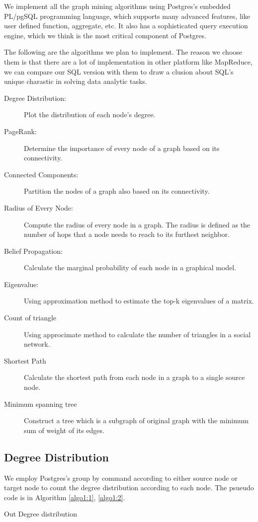 We implement all the graph mining algorithms using Postgres's embedded PL/pgSQL programming language, which supports many advanced features, like user defined function, aggregate, etc. It also has a sophisticated query execution engine, which we think is the most critical component of Postgres.

The following are the algorithms we plan to implement. The reason we choose them is that there are a lot of implementation in other platform like MapReduce, we can compare our SQL version with them to draw a clusion about SQL's unique charastic in solving data analytic tasks.

\begin{description}
  \item[Degree Distribution:] Plot the distribution of each node's degree. 
  \item[PageRank:] Determine the importance of every node of a graph based on its connectivity. 
  \item[Connected Components:] Partition the nodes of a graph also based on its connectivity.
  \item[Radius of Every Node:] Compute the radius of every node in a graph. The radius is defined as the number of hops that a node needs to reach to its furthest neighbor.
  \item[Belief Propagation:] Calculate the marginal probability of each node in a graphical model. 
  \item[Eigenvalue:] Using approximation method to estimate the top-k eigenvalues of a matrix.
  \item[Count of triangle] Using approcimate method to calculate the number of triangles in a social network.
  \item[Shortest Path] Calculate the shortest path from each node in a graph to a single source node. 
  \item[Minimum spanning tree] Construct a tree which is a subgraph of original graph with the minimum sum of weight of its edges. 
\end{description}

\subsection{Degree Distribution}
We employ Postgres's group by command according to either source node or target node to count the degree distribution according to each node. The psueudo code is in Algorithm \ref{algo1:1}, \ref{algo1:2}.

\begin{algorithm}
\caption{Out Degree distribution}
\begin{algorithmic}
\end{algorithmic}
\label{algo1:1}
\end{algorithm}

